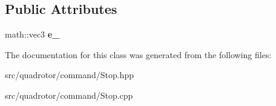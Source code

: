 \subsection*{\-Public \-Attributes}
\begin{DoxyCompactItemize}
\item 
\hypertarget{classCommand_1_1Stop_1_1XSettle_a96f016552eec74ab167d3e0c663a8733}{math\-::vec3 {\bfseries e\-\_\-}}\label{classCommand_1_1Stop_1_1XSettle_a96f016552eec74ab167d3e0c663a8733}

\end{DoxyCompactItemize}


\-The documentation for this class was generated from the following files\-:\begin{DoxyCompactItemize}
\item 
src/quadrotor/command/\-Stop.\-hpp\item 
src/quadrotor/command/\-Stop.\-cpp\end{DoxyCompactItemize}
